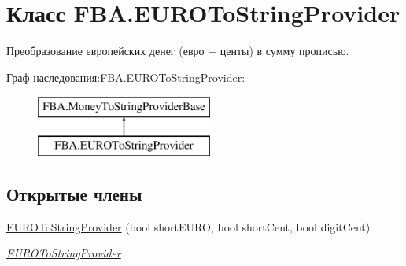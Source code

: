 \hypertarget{class_f_b_a_1_1_e_u_r_o_to_string_provider}{}\section{Класс F\+B\+A.\+E\+U\+R\+O\+To\+String\+Provider}
\label{class_f_b_a_1_1_e_u_r_o_to_string_provider}


Преобразование европейских денег (евро + центы) в сумму прописью.  


Граф наследования\+:F\+B\+A.\+E\+U\+R\+O\+To\+String\+Provider\+:\begin{figure}[H]
\begin{center}
\leavevmode
\includegraphics[height=2.000000cm]{class_f_b_a_1_1_e_u_r_o_to_string_provider}
\end{center}
\end{figure}
\subsection*{Открытые члены}
\begin{DoxyCompactItemize}
\item 
\mbox{\hyperlink{class_f_b_a_1_1_e_u_r_o_to_string_provider_a776ee86ca928d01b03d8501e0d40d4a9}{E\+U\+R\+O\+To\+String\+Provider}} (bool short\+E\+U\+RO, bool short\+Cent, bool digit\+Cent)
\begin{DoxyCompactList}\small\item\em \mbox{\hyperlink{class_f_b_a_1_1_e_u_r_o_to_string_provider}{E\+U\+R\+O\+To\+String\+Provider}} \end{DoxyCompactList}\end{DoxyCompactItemize}
